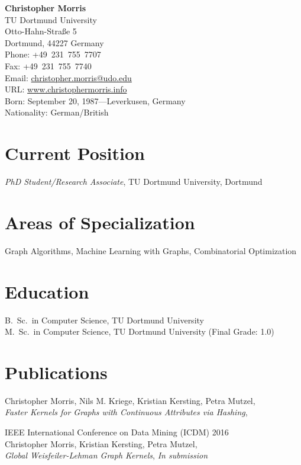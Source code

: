 \documentclass[11pt, a4paper]{scrartcl}
\newcommand{\years}[1]{\marginnote {\bf #1}}
\begin{document}
{\LARGE \bf Christopher Morris}\\[1cm] 
TU Dortmund University\\ 
Otto-Hahn-Stra\ss{}e 5\\
Dortmund, 44227
Germany\\[.2cm]
Phone: +49\ 231~755~7707\\ 
Fax: +49~231~755~7740\\[.2cm] 
Email: \href{mailto:christopher.morris@udo.edu}{christopher.morris@udo.edu}\\
URL: \href{www.christophermorris.info}{www.christophermorris.info}\\ 

Born: September 20, 1987---Leverkusen, Germany\\ 
Nationality: German/British 

\section*{Current Position}
\emph{PhD Student/Research Associate}, TU Dortmund University, Dortmund %

\section*{Areas of Specialization}
Graph Algorithms, Machine Learning with Graphs, Combinatorial Optimization

\section*{Education}
\years{2012} B.~Sc.~in Computer Science, TU Dortmund University\\
\years{2015} M.~Sc.~in Computer Science, TU Dortmund University (Final Grade: 1.0) 

\section*{Publications}

\years{2016} Christopher Morris, Nils M. Kriege, Kristian Kersting, Petra Mutzel, \\
\emph{Faster Kernels for Graphs with Continuous Attributes via Hashing},

IEEE International Conference on Data Mining (ICDM) 2016\\

\years{2017} Christopher Morris, Kristian Kersting, Petra Mutzel, \\
\emph{Global Weisfeiler-Lehman Graph Kernels},
\emph{In submission}\\
\end{document}
